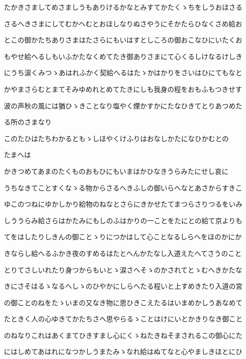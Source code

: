 \documentclass[a4paper,11pt,landscape]{ltjtarticle}
\begin{document}
たかきさましてめさましうもありけるかなとみすてかたくゝちをしうおほさる
\par\medskip
さるへきさまにしてむかへむとおほしなりぬさやうにそかたらひなくさめ給お
\par\medskip
とこの御かたちありさまはたさらにもいはすとしころの御おこなひにいたくお
\par\medskip
もやせ給へるしもいふかたなくめてたき御ありさまにて心くるしけなるけしき
\par\medskip
にうち涙くみつゝあはれふかく契給へるはたゝかはかりをさいはひにてもなと
\par\medskip
かやまさらむとまてそみゆめれとめてたきにしも我身の程をおもふもつきせす
\par\medskip
波の声秋の風には猶ひゝきことなり塩やく煙かすかにたなひきてとりあつめた
\par\medskip
る所のさまなり
\par\medskip
このたひはたちわかるともゝしほやくけふりはおなしかたになひかむとの
\par\medskip
たまへは
\par\medskip
かきつめてあまのたくものおもひにもいまはかひなきうらみたにせし哀に
\par\medskip
うちなきてことすくなゝる物からさるへきふしの御いらへなとあさからすきこ
\par\medskip
ゆこのつねにゆかしかり給物のねなとさらにきかせたてまつらさりつるをいみ
\par\medskip
しううらみ給さらはかたみにもしのふはかりの一ことをたにとの給て京よりも
\par\medskip
てをはしたりしきんの御ことゝりにつかはして心ことなるしらへをほのかにか
\par\medskip
きならし給へるふかき夜のすめるはたとへんかたなし入道えたへてさうのこと
\par\medskip
とりてさしいれたり身つからもいとゝ涙さへそゝのかされてとゝむへきかたな
\par\medskip
きにさそはるゝなるへしゝのひやかにしらへたる程いと上すめきたり入道の宮
\par\medskip
の御ことのねをたゝいまの又なき物に思ひきこえたるはいまめかしうあなめて
\par\medskip
たときく人の心ゆきてかたちさへ思やらるゝことはけにいとかきりなき御こと
\par\medskip
のねなりこれはあくまてひきすまし心にくゝねたきねそまされるこの御心にた
\par\medskip
にはしめてあはれになつかしうまたみゝなれ給はぬてなと心やましきほとにひ
\par\medskip
\end{document}

